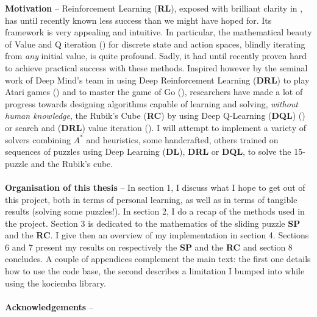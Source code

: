 
\label{Abstract}
\noindent \textbf{Motivation} -- Reinforcement Learning (\textbf{RL}), exposed with brilliant clarity in \cite{Sutton1998}, has until recently known less success than we might have hoped for. Its framework is very appealing and intuitive. In particular, the mathematical beauty of Value and Q iteration (\cite{WatkinsThesis}) for discrete state and action spaces, blindly iterating from \textit{any} initial value, is quite profound. Sadly, it had until recently proven hard to achieve practical success with these methods. Inspired however by the seminal work of Deep Mind's team in using Deep Reinforcement Learning (\textbf{DRL}) to play Atari games (\cite{Mnih2013})  and to master the game of Go (\cite{AlphaGo}), researchers have made a lot of progress towards designing algorithms capable of learning and solving, \textit{without human knowledge}, the Rubik's Cube (\textbf{RC}) by using Deep Q-Learning (\textbf{DQL})  (\cite{DBLP:journals/corr/abs-1805-07470}) or search and (\textbf{DRL}) value iteration (\cite{https://doi.org/10.48550/arxiv.1805.07470}). I will attempt to implement a variety of solvers combining $A^{*}$ and heuristics, some handcrafted, others trained on sequences of puzzles using Deep Learning (\textbf{DL}), \textbf{DRL} or \textbf{DQL}, to solve the 15-puzzle and the Rubik's cube.
\\
\\
\textbf{Organisation of this thesis} -- In section 1, I discuss what I hope to get out of this project, both in terms of personal learning, as well as in terms of tangible results (solving some puzzles!). In section 2, I do a recap of the methods used in the project. Section 3 is dedicated to the mathematics of the sliding puzzle \textbf{SP} and the \textbf{RC}. I give then an overview of my implementation in section 4. Sections 6 and 7 present my results on respectively the \textbf{SP} and the \textbf{RC} and section 8 concludes. A couple of appendices complement the main text: the first one details how to use the code base, the second describes a limitation I bumped into while using the kociemba library.
\\
\\
\noindent \textbf{Acknowledgements} -- 
